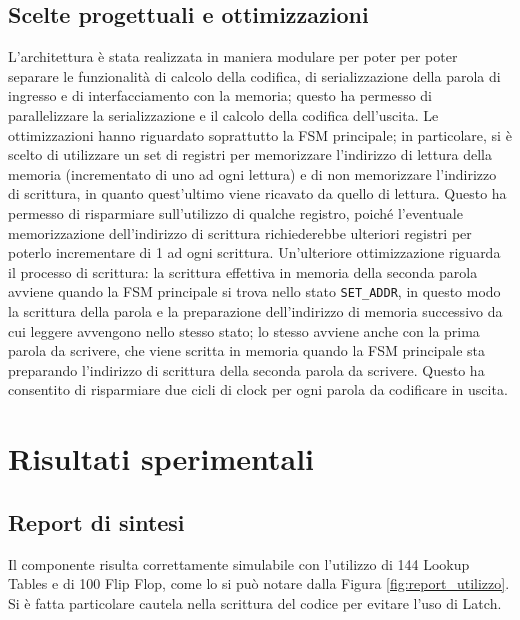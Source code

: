 \documentclass{article}
\begin{document}
\subsection{Scelte progettuali e ottimizzazioni}

L'architettura è stata realizzata in maniera modulare per poter per poter separare le funzionalità di calcolo della codifica, di serializzazione della parola di ingresso e di interfacciamento con la memoria; questo ha permesso di parallelizzare la serializzazione e il calcolo della codifica dell'uscita.
\newline Le ottimizzazioni hanno riguardato soprattutto la FSM principale; in particolare, si è scelto di utilizzare un set di registri per memorizzare l'indirizzo di lettura della memoria (incrementato di uno ad ogni lettura) e di non memorizzare l'indirizzo di scrittura, in quanto quest'ultimo viene ricavato da quello di lettura. Questo ha permesso di risparmiare sull'utilizzo di qualche registro, poiché l'eventuale memorizzazione dell'indirizzo di scrittura richiederebbe ulteriori registri per poterlo incrementare di 1 ad ogni scrittura. 
\newline Un'ulteriore ottimizzazione riguarda il processo di scrittura: la scrittura effettiva in memoria della seconda parola avviene quando la FSM principale si trova nello stato \texttt{SET\_ADDR}, in questo modo la scrittura della parola e la preparazione dell'indirizzo di memoria successivo da cui leggere avvengono nello stesso stato; lo stesso avviene anche con la prima parola da scrivere, che viene scritta in memoria quando la FSM principale sta preparando l'indirizzo di scrittura della seconda parola da scrivere. Questo ha consentito di risparmiare due cicli di clock per ogni parola da codificare in uscita.

\section{Risultati sperimentali}

\subsection{Report di sintesi}

Il componente risulta correttamente simulabile con l'utilizzo di 144 Lookup Tables e di 100 Flip Flop, come lo si può notare dalla Figura \ref{fig:report_utilizzo}. Si è fatta particolare cautela nella scrittura del codice per evitare l'uso di Latch.
\end{document}
